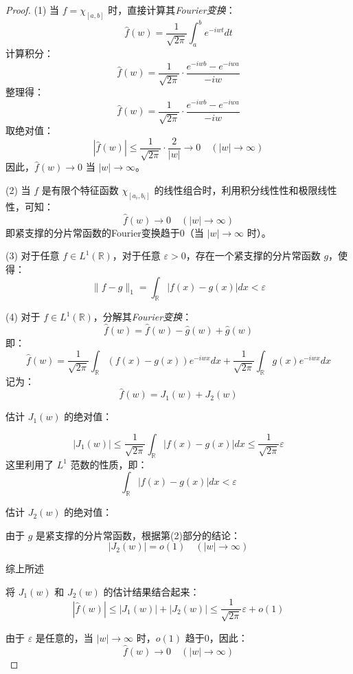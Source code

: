 \documentclass[12pt,a4paper]{article}
\theoremstyle{plain}
\theoremstyle{definition}
\theoremstyle{remark}
\begin{document}
	\begin{proof}
		(1) 当 \( f = \chi_{[a, b]} \) 时，直接计算其\emph{Fourier变换}：
		\[
		\hat{f}(w) = \frac{1}{\sqrt{2\pi}} \int_{a}^{b} e^{-i w t} dt
		\]
		计算积分：
		\[
		\hat{f}(w) = \frac{1}{\sqrt{2\pi}} \cdot \frac{e^{-i w b} - e^{-i w a}}{-i w}
		\]
		整理得：
		\[
		\hat{f}(w) = \frac{1}{\sqrt{2\pi}} \cdot \frac{e^{-i w b} - e^{-i w a}}{-i w}
		\]
		取绝对值：
		\[
		|\hat{f}(w)| \leq \frac{1}{\sqrt{2\pi}} \cdot \frac{2}{|w|} \to 0 \quad (|w| \to \infty)
		\]
		因此，\( \hat{f}(w) \to 0 \) 当 \( |w| \to \infty \)。
		
		(2) 当 \( f \) 是有限个特征函数 \( \chi_{[a_i, b_i]} \) 的线性组合时，利用积分线性性和极限线性性，可知：
		\[
		\hat{f}(w) \to 0 \quad (|w| \to \infty)
		\]
		即紧支撑的分片常函数的Fourier变换趋于0（当 \( |w| \to \infty \) 时）。
		
		(3) 对于任意 \( f \in L^1(\mathbb{R}) \)，对于任意 \( \varepsilon > 0 \)，存在一个紧支撑的分片常函数 \( g \)，使得：
		\[
		\|f - g\|_1 = \int_{\mathbb{R}} |f(x) - g(x)| dx < \varepsilon
		\]
		
		(4) 对于 \( f \in L^1(\mathbb{R}) \)，分解其\emph{Fourier变换}：
		\[
		\hat{f}(w) = \hat{f}(w) - \hat{g}(w) + \hat{g}(w)
		\]
		即：
		\[
		\hat{f}(w) = \frac{1}{\sqrt{2\pi}} \int_{\mathbb{R}} (f(x) - g(x)) e^{-i w x} dx + \frac{1}{\sqrt{2\pi}} \int_{\mathbb{R}} g(x) e^{-i w x} dx
		\]
		记为：
		\[
		\hat{f}(w) = J_1(w) + J_2(w)
		\]
		
		估计 \( J_1(w) \) 的绝对值：
		
		\[
		|J_1(w)| \leq \frac{1}{\sqrt{2\pi}} \int_{\mathbb{R}} |f(x) - g(x)| dx \leq \frac{1}{\sqrt{2\pi}} \varepsilon
		\]
		这里利用了 \( L^1 \) 范数的性质，即：
		\[
		\int_{\mathbb{R}} |f(x) - g(x)| dx < \varepsilon
		\]
		
		估计 \( J_2(w) \) 的绝对值：
		
		由于 \( g \) 是紧支撑的分片常函数，根据第(2)部分的结论：
		\[
		|J_2(w)| = o(1) \quad (|w| \to \infty)
		\]
		
		综上所述
		
		将 \( J_1(w) \) 和 \( J_2(w) \) 的估计结果结合起来：
		\[
		|\hat{f}(w)| \leq |J_1(w)| + |J_2(w)| \leq \frac{1}{\sqrt{2\pi}} \varepsilon + o(1)
		\]
		
		由于 \( \varepsilon \) 是任意的，当 \( |w| \to \infty \) 时，\( o(1) \) 趋于0，因此：
		\[
		\hat{f}(w) \to 0 \quad (|w| \to \infty)
		\]
		
	\end{proof}
	
	
	
\end{document}
